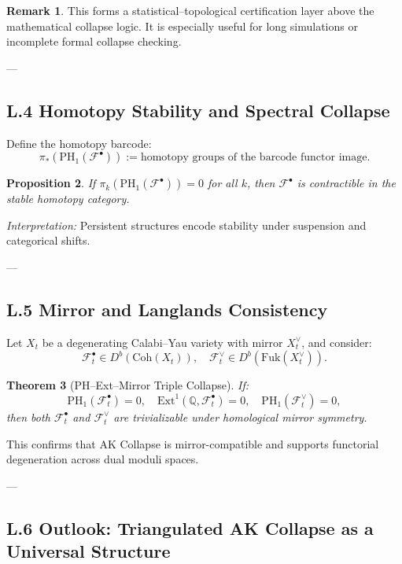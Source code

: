 \documentclass[11pt]{article}
\newtheorem{theorem}{Theorem}[section]
\newtheorem{proposition}[theorem]{Proposition}
\theoremstyle{definition}
\newtheorem{remark}[theorem]{Remark}
\begin{document}
\begin{remark}
This forms a statistical–topological certification layer above the mathematical collapse logic.  
It is especially useful for long simulations or incomplete formal collapse checking.
\end{remark}

---

\subsection*{L.4 Homotopy Stability and Spectral Collapse}

Define the homotopy barcode:
\[
\pi_*(\mathrm{PH}_1(\mathcal{F}^\bullet)) := \text{homotopy groups of the barcode functor image}.
\]

\begin{proposition}
If \( \pi_k(\mathrm{PH}_1(\mathcal{F}^\bullet)) = 0 \) for all \( k \), then \( \mathcal{F}^\bullet \) is contractible in the stable homotopy category.
\end{proposition}

\textit{Interpretation:} Persistent structures encode stability under suspension and categorical shifts.

---

\subsection*{L.5 Mirror and Langlands Consistency}

Let \( X_t \) be a degenerating Calabi–Yau variety with mirror \( X_t^\vee \), and consider:
\[
\mathcal{F}_t^\bullet \in D^b(\mathrm{Coh}(X_t)), \quad \mathcal{F}_t^\vee \in D^b(\mathrm{Fuk}(X_t^\vee)).
\]

\begin{theorem}[PH–Ext–Mirror Triple Collapse]
If:
\[
\mathrm{PH}_1(\mathcal{F}_t^\bullet) = 0, \quad \mathrm{Ext}^1(\mathbb{Q}, \mathcal{F}_t^\bullet) = 0, \quad \mathrm{PH}_1(\mathcal{F}_t^\vee) = 0,
\]
then both \( \mathcal{F}_t^\bullet \) and \( \mathcal{F}_t^\vee \) are trivializable under homological mirror symmetry.
\end{theorem}

This confirms that AK Collapse is mirror-compatible and supports functorial degeneration across dual moduli spaces.

---

\subsection*{L.6 Outlook: Triangulated AK Collapse as a Universal Structure}
\end{document}
